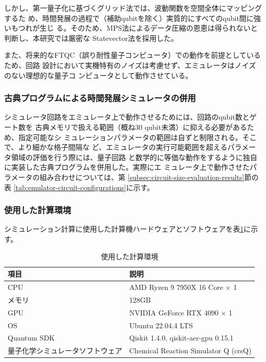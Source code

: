 \documentclass[wabun2025.tex]{subfiles}
\begin{document}
しかし、第一量子化に基づくグリッド法では、波動関数を空間全体にマッピングするた
め、時間発展の過程で（補助qubitを除く）実質的にすべてのqubit間に強いもつれが生じ
る。そのため、MPS法によるデータ圧縮の恩恵は得られないと判断し、本研究では厳密な
Statevector法を採用した。

また、将来的なFTQC（誤り耐性量子コンピュータ）での動作を前提としているため、回路
設計において実機特有のノイズは考慮せず、エミュレータはノイズのない理想的な量子コ
ンピュータとして動作させている。

\subsubsection{古典プログラムによる時間発展シミュレータの併用}
シミュレータ回路をエミュレータ上で動作させるためには、回路のqubit数とゲート数を
古典メモリで扱える範囲（概ね30 qubit未満）に抑える必要があるため、指定可能なシ
ミュレーションパラメータの範囲は自ずと制限される。そこで、より細かな格子間隔な
ど、エミュレータの実行可能範囲を超えるパラメータ領域の評価を行う際には、量子回路
と数学的に等価な動作をするように独自に実装した古典プログラムを併用した。実際にエ
ミュレータ上で動作させたパラメータの組み合わせについては、第
\ref{subsec:circuit-size-evaluation-results}節の表
\ref{tab:emulator-circuit-configurations}に示す。


\subsubsection{使用した計算環境}
シミュレーション計算に使用した計算機ハードウェアとソフトウェアを表\ref{tab:computing-environment}に示す。

\begin{table}[ht]
    \centering
    \caption{使用した計算環境}
    \begin{tabular}{ll}
        項目 & 説明 \\
        \hline
        CPU & AMD Ryzen 9 7950X 16 Core × 1 \\
        メモリ & 128GB \\
        GPU & NVIDIA GeForce RTX 4090 × 1 \\
        OS & Ubuntu 22.04.4 LTS \\
        Quantum SDK & Qiskit 1.4.0, qiskit-aer-gpu 0.15.1 \\
        量子化学シミュレータソフトウェア & Chemical Reaction Simulator Q (crsQ) \cite{website:crsq}
    \end{tabular}
    \label{tab:computing-environment}
\end{table}
\end{document}
